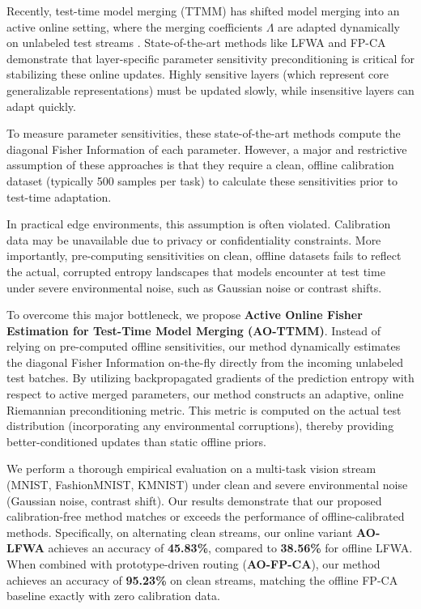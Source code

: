 \documentclass{article}
\theoremstyle{plain}
\theoremstyle{definition}
\begin{document}
Recently, test-time model merging (TTMM) has shifted model merging into an active online setting, where the merging coefficients $\Lambda$ are adapted dynamically on unlabeled test streams \cite{adamerging, lfwa, fpca}. State-of-the-art methods like LFWA and FP-CA demonstrate that layer-specific parameter sensitivity preconditioning is critical for stabilizing these online updates. Highly sensitive layers (which represent core generalizable representations) must be updated slowly, while insensitive layers can adapt quickly. 

To measure parameter sensitivities, these state-of-the-art methods compute the diagonal Fisher Information of each parameter. However, a major and restrictive assumption of these approaches is that they require a clean, offline calibration dataset (typically 500 samples per task) to calculate these sensitivities prior to test-time adaptation.

In practical edge environments, this assumption is often violated. Calibration data may be unavailable due to privacy or confidentiality constraints. More importantly, pre-computing sensitivities on clean, offline datasets fails to reflect the actual, corrupted entropy landscapes that models encounter at test time under severe environmental noise, such as Gaussian noise or contrast shifts.

To overcome this major bottleneck, we propose \textbf{Active Online Fisher Estimation for Test-Time Model Merging (AO-TTMM)}. Instead of relying on pre-computed offline sensitivities, our method dynamically estimates the diagonal Fisher Information on-the-fly directly from the incoming unlabeled test batches. By utilizing backpropagated gradients of the prediction entropy with respect to active merged parameters, our method constructs an adaptive, online Riemannian preconditioning metric. This metric is computed on the actual test distribution (incorporating any environmental corruptions), thereby providing better-conditioned updates than static offline priors.

We perform a thorough empirical evaluation on a multi-task vision stream (MNIST, FashionMNIST, KMNIST) under clean and severe environmental noise (Gaussian noise, contrast shift). Our results demonstrate that our proposed calibration-free method matches or exceeds the performance of offline-calibrated methods. Specifically, on alternating clean streams, our online variant \textbf{AO-LFWA} achieves an accuracy of \textbf{45.83\%}, compared to \textbf{38.56\%} for offline LFWA. When combined with prototype-driven routing (\textbf{AO-FP-CA}), our method achieves an accuracy of \textbf{95.23\%} on clean streams, matching the offline FP-CA baseline exactly with zero calibration data.
\end{document}
